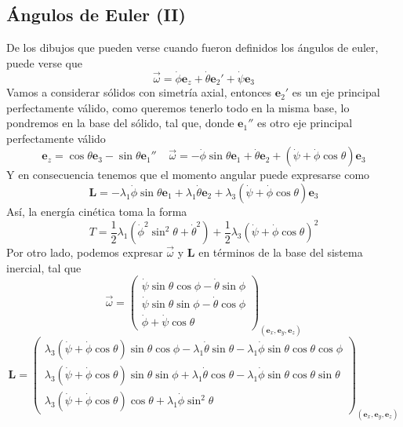 \subsection{Ángulos de Euler (II)}
De los dibujos que pueden verse cuando fueron definidos los ángulos de euler, puede verse que 
\begin{equation} \label{6.1.1}
    \vec{\omega} = \dot{\phi} \mathbf{e}_z + \dot{\theta} \mathbf{e}_2'+\dot{\psi} \mathbf{e}_3
\end{equation}
Vamos a considerar sólidos con simetría axial, entonces $\mathbf{e}_2'$ es un eje principal perfectamente válido, como queremos tenerlo todo en la misma base, lo pondremos en la base del sólido, tal que, donde $\mathbf{e}_1''$ es otro eje principal perfectamente válido
\begin{equation} \label{6.1.1}
    \mathbf{e}_z = \cos\theta \mathbf{e}_3 - \sin\theta \mathbf{e}_1'' \ \ \ \ \ \vec{\omega} = -\dot{\phi}\sin\theta \mathbf{e}_1 + \dot{\theta} \mathbf{e}_2+(\dot{\psi}+\dot{\phi}\cos\theta)\mathbf{e}_3
\end{equation}
Y en consecuencia tenemos que el momento angular puede expresarse como
\begin{equation} \label{6.1.1}
    \mathbf{L} = -\lambda_1\dot{\phi}\sin\theta \mathbf{e}_1 + \lambda_1 \dot{\theta} \mathbf{e}_2+\lambda_3(\dot{\psi}+\dot{\phi}\cos\theta)\mathbf{e}_3
\end{equation}
Así, la energía cinética toma la forma
\begin{equation} \label{6.1.1}
    T = \frac{1}{2}\lambda_1\left(\dot{\phi}^2\sin^2\theta+ \dot{\theta}^2\right)+\frac{1}{2}\lambda_3\left(\dot{\psi}+\dot{\phi}\cos\theta\right)^2
\end{equation}
Por otro lado, podemos expresar $\vec{\omega}$ y $\mathbf{L}$ en términos de la base del sistema inercial, tal que
\begin{equation} \label{6.1.1}
    \vec{\omega} = \left(\begin{matrix}
    \dot{\psi}\sin\theta\cos\phi - \dot{\theta}\sin\phi\\
    \dot{\psi}\sin\theta\sin\phi - \dot{\theta}\cos\phi\\
    \dot{\phi} + \dot{\psi}\cos\theta
    \end{matrix}\right)_{(\mathbf{e}_x,\mathbf{e}_y,\mathbf{e}_z)}
\end{equation}
\begin{equation} \label{6.1.1}
    \mathbf{L} = \left(\begin{matrix}
    \lambda_3(\dot{\psi}+\dot{\phi}\cos\theta)\sin\theta \cos\phi-\lambda_1\dot{\theta}\sin\theta -\lambda_1 \dot{\phi} \sin\theta\cos\theta\cos\phi\\
    \lambda_3(\dot{\psi}+\dot{\phi}\cos\theta)\sin\theta \sin\phi+\lambda_1\dot{\theta}\cos\theta-\lambda_1 \dot{\phi} \sin\theta\cos\theta\sin\theta\\
    \lambda_3(\dot{\psi}+\dot{\phi}\cos\theta)\cos\theta+\lambda_1 \dot{\phi} \sin^2\theta
    \end{matrix}\right)_{(\mathbf{e}_x,\mathbf{e}_y,\mathbf{e}_z)}
\end{equation}

